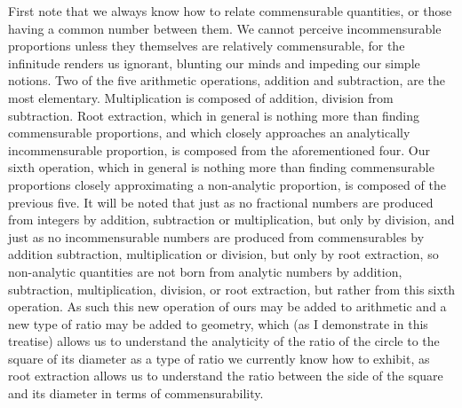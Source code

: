 \documentclass[11pt,letterpaper]{book}
\begin{document}
First note that we always know how to relate commensurable quantities, or
those having a common number between them. We cannot perceive incommensurable
proportions unless they themselves are relatively commensurable, for the
infinitude renders us ignorant, blunting our minds and impeding our simple
notions. Two of the five arithmetic operations, addition and subtraction, are
the most elementary. Multiplication is composed of addition, division from
subtraction. Root extraction, which in general is nothing more than finding
commensurable proportions, and which closely approaches an analytically
incommensurable proportion, is composed from the aforementioned four. Our sixth
operation, which in general is nothing more than finding commensurable
proportions closely approximating a non-analytic proportion, is composed of the
previous five. It will be noted that just as no fractional numbers are produced
from integers by addition, subtraction or multiplication, but only by division,
and just as no incommensurable numbers are produced from commensurables by
addition subtraction, multiplication or division, but only by root extraction,
so non-analytic quantities are not born from analytic numbers by addition,
subtraction, multiplication, division, or root extraction, but rather from this
sixth operation. As such this new operation of ours may be added to arithmetic
and a new type of ratio may be added to geometry, which (as I demonstrate in
this treatise) allows us to understand the analyticity of the ratio of the
circle to the square of its diameter as a type of ratio we currently know how to
exhibit, as root extraction allows us to understand the ratio between the side
of the square and its diameter in terms of commensurability.
\end{document}
